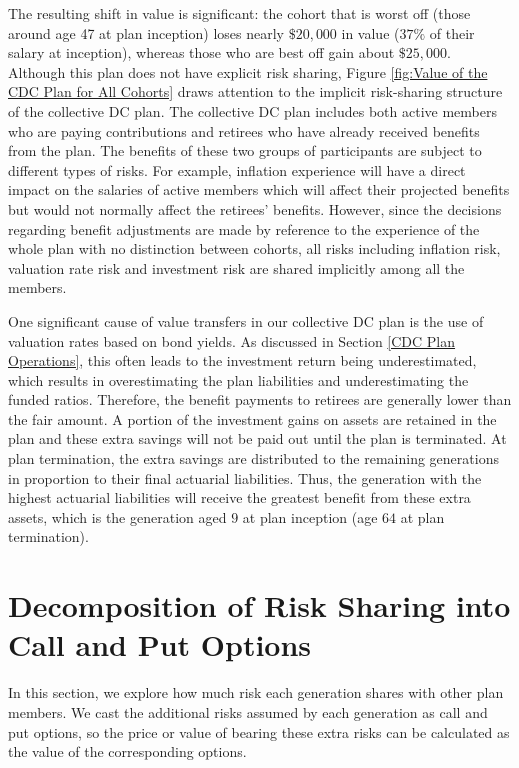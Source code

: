 \documentclass{sfuthesis}
\numberwithin{equation}{chapter}
\begin{document}
		\justify
		The resulting shift in value is significant: the cohort that is worst off (those around age 47 at plan inception) loses nearly $\$20{,}000$ in value ($37\%$ of their salary at inception), whereas those who are best off gain about $\$25{,}000$. Although this plan does not have explicit risk sharing, Figure \ref{fig:Value of the CDC Plan for All Cohorts} draws attention to the implicit risk-sharing structure of the collective DC plan. The collective DC plan includes both active members who are paying contributions and retirees who have already received benefits from the plan. The benefits of these two groups of participants are subject to different types of risks. For example, inflation experience will have a direct impact on the salaries of active members which will affect their projected benefits but would not normally affect the retirees' benefits. However, since the decisions regarding benefit adjustments are made by reference to the experience of the whole plan with no distinction between cohorts, all risks including inflation risk, valuation rate risk and investment risk are shared implicitly among all the members. 
	
		\justify
		One significant cause of value transfers in our collective DC plan is the use of valuation rates based on bond yields. As discussed in Section \ref{CDC Plan Operations}, this often leads to the investment return being underestimated, which results in overestimating the plan liabilities and underestimating the funded ratios. Therefore, the benefit payments to retirees are generally lower than the fair amount. A portion of the investment gains on assets are retained in the plan and these extra savings will not be paid out until the plan is terminated. At plan termination, the extra savings are distributed to the remaining generations in proportion to their final actuarial liabilities. Thus, the generation with the highest actuarial liabilities will receive the greatest benefit from these extra assets, which is the generation aged $9$ at plan inception (age $64$ at plan termination). 
	
	
	
	\section{Decomposition of Risk Sharing into Call and Put Options}
	\label{Surplus and Deficit Options}
	
		\justify
		In this section, we explore how much risk each generation shares with other plan members. We cast the additional risks assumed by each generation as call and put options, so the price or value of bearing these extra risks can be calculated as the value of the corresponding options.
	
\end{document}
